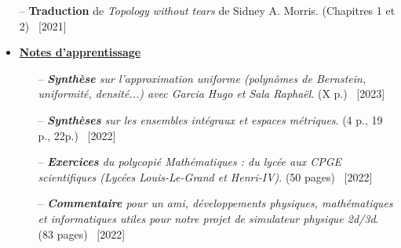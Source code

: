 \documentclass[10pt]{article}
\newcommand\tab[1][1cm]{\hspace*{#1}}
\begin{document}
\begin{itemize}[itemsep = -0.75 mm]
			\item[--] \noindent \textbf{Traduction} de \textit{Topology without tears} de Sidney A. Morris. (Chapitres 1 et 2)  \hspace*{\fill} {\ \small [2021]}
	\text{}\newline
			\item \underline{\textbf{\large{Notes d'apprentissage}}}
				\begin{itemize}
					\item[--] \noindent \textit{\textbf{Synthèse} sur l'approximation uniforme (polynômes de Bernstein, uniformité, densité...) avec Garcia Hugo et Sala Raphaël}. (X p.) \hfill {\ \small [2023] }
					\item[--] \noindent \textit{\textbf{Synthèses} sur les ensembles intégraux et espaces métriques}. (4 p., 19 p., 22p.) \hfill {\ \small [2022] }
					
					\item[--] \noindent \textit{\textbf{Exercices} du polycopié Mathématiques : du lycée aux CPGE scientifiques (Lycées Louis-Le-Grand et Henri-IV)}. (50 pages) \hfill {\ \small [2022] }
					
					\item[--] \noindent \textit{\textbf{Commentaire} pour un ami, développements physiques, mathématiques et informatiques utiles pour notre projet de simulateur physique 2d/3d}. (83 pages)  \hfill {\ \small [2022]}
					
	
	
	
	
	
	
	
	

\end{itemize}
\end{itemize}
\end{document}
